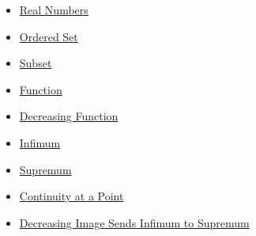 \begin{dependencies}
\begin{itemize}
  \item \hyperref[def:reals]{Real Numbers}
  \item \hyperref[def:ordered-set]{Ordered Set}
  \item \hyperref[def:subset]{Subset}
  \item \hyperref[def:function]{Function}
  \item \hyperref[def:function-decreasing]{Decreasing Function}
  \item \hyperref[def:infimum]{Infimum}
  \item \hyperref[def:supremum]{Supremum}
  \item \hyperref[def:continuous-at-point]{Continuity at a Point}
  \item \hyperref[thm:decreasing-image-infimum-to-supremum]{Decreasing Image Sends Infimum to Supremum}
\end{itemize}
\end{dependencies}

